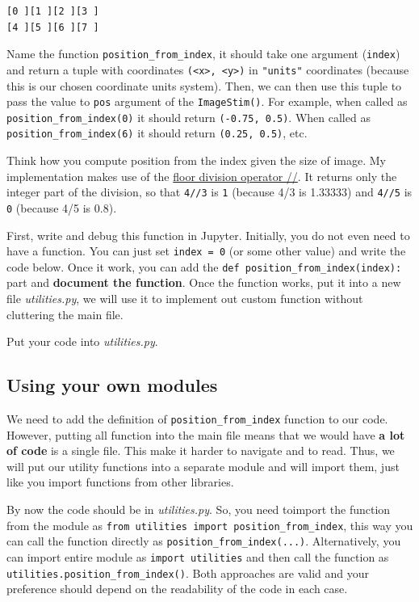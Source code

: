 \documentclass[
]{book}
\begin{document}
\begin{verbatim}
[0 ][1 ][2 ][3 ]
[4 ][5 ][6 ][7 ]
\end{verbatim}

Name the function \texttt{position\_from\_index}, it should take one argument (\texttt{index}) and return a tuple with coordinates \texttt{(\textless{}x\textgreater{},\ \textless{}y\textgreater{})} in \texttt{"units"} coordinates (because this is our chosen coordinate units system). Then, we can then use this tuple to pass the value to \texttt{pos} argument of the \texttt{ImageStim()}. For example, when called as \texttt{position\_from\_index(0)} it should return \texttt{(-0.75,\ 0.5)}. When called as \texttt{position\_from\_index(6)} it should return \texttt{(0.25,\ 0.5)}, etc.

Think how you compute position from the index given the size of image. My implementation makes use of the \href{https://python-reference.readthedocs.io/en/latest/docs/operators/floor_division.html}{floor division operator //}. It returns only the integer part of the division, so that \texttt{4//3} is \texttt{1} (because 4/3 is 1.33333) and \texttt{4//5} is \texttt{0} (because 4/5 is 0.8).

First, write and debug this function in Jupyter. Initially, you do not even need to have a function. You can just set \texttt{index\ =\ 0} (or some other value) and write the code below. Once it work, you can add the \texttt{def\ position\_from\_index(index):} part and \textbf{document the function}. Once the function works, put it into a new file \emph{utilities.py}, we will use it to implement out custom function without cluttering the main file.

Put your code into \emph{utilities.py}.

\hypertarget{using-your-own-modules}{%
\subsection{Using your own modules}\label{using-your-own-modules}}

We need to add the definition of \texttt{position\_from\_index} function to our code. However, putting all function into the main file means that we would have \textbf{a lot of code} is a single file. This make it harder to navigate and to read. Thus, we will put our utility functions into a separate module and will import them, just like you import functions from other libraries.

By now the code should be in \emph{utilities.py}. So, you need toimport the function from the module as \texttt{from\ utilities\ import\ position\_from\_index}, this way you can call the function directly as \texttt{position\_from\_index(...)}. Alternatively, you can import entire module as \texttt{import\ utilities} and then call the function as \texttt{utilities.position\_from\_index()}. Both approaches are valid and your preference should depend on the readability of the code in each case.
\end{document}
